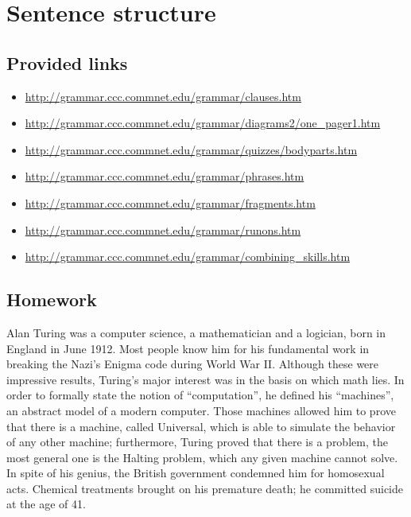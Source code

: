
\chapter{Sentence structure}


\section{Provided links}

\begin{itemize}
    \item \url{http://grammar.ccc.commnet.edu/grammar/clauses.htm}
    \item \url{http://grammar.ccc.commnet.edu/grammar/diagrams2/one_pager1.htm}
    \item \url{http://grammar.ccc.commnet.edu/grammar/quizzes/bodyparts.htm}
    \item \url{http://grammar.ccc.commnet.edu/grammar/phrases.htm}
    \item \url{http://grammar.ccc.commnet.edu/grammar/fragments.htm}
    \item \url{http://grammar.ccc.commnet.edu/grammar/runons.htm}
    \item \url{http://grammar.ccc.commnet.edu/grammar/combining_skills.htm}
\end{itemize}


\section{Homework}

Alan Turing was a computer science, a mathematician and a logician,
born in England in June 1912. Most people know him for his
fundamental work in breaking the Nazi's Enigma code during World War
II. Although these were impressive results, Turing's major interest was in
the basis on which math lies.  In order to formally state the notion
of ``computation'', he defined his ``machines'', an abstract model of
a modern computer. Those machines allowed him to prove that there
is a machine, called Universal, which is able to simulate the behavior of
any other machine; furthermore, Turing proved that there is a
problem, the most general one is the Halting problem, which any 
given machine cannot solve. 
In spite of his genius, the British government condemned him for
homosexual acts. Chemical treatments brought on his premature death;
he committed suicide at the age of 41.
